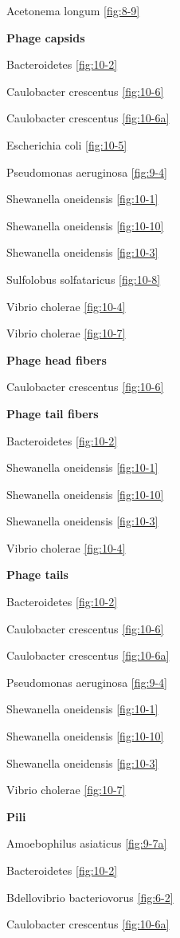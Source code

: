\documentclass[]{tufte-book}
\begin{document}
Acetonema longum \ref{fig:8-9}

\textbf{Phage capsids}

Bacteroidetes \ref{fig:10-2}

Caulobacter crescentus \ref{fig:10-6}

Caulobacter crescentus \ref{fig:10-6a}

Escherichia coli \ref{fig:10-5}

Pseudomonas aeruginosa \ref{fig:9-4}

Shewanella oneidensis \ref{fig:10-1}

Shewanella oneidensis \ref{fig:10-10}

Shewanella oneidensis \ref{fig:10-3}

Sulfolobus solfataricus \ref{fig:10-8}

Vibrio cholerae \ref{fig:10-4}

Vibrio cholerae \ref{fig:10-7}

\textbf{Phage head fibers}

Caulobacter crescentus \ref{fig:10-6}

\textbf{Phage tail fibers}

Bacteroidetes \ref{fig:10-2}

Shewanella oneidensis \ref{fig:10-1}

Shewanella oneidensis \ref{fig:10-10}

Shewanella oneidensis \ref{fig:10-3}

Vibrio cholerae \ref{fig:10-4}

\textbf{Phage tails}

Bacteroidetes \ref{fig:10-2}

Caulobacter crescentus \ref{fig:10-6}

Caulobacter crescentus \ref{fig:10-6a}

Pseudomonas aeruginosa \ref{fig:9-4}

Shewanella oneidensis \ref{fig:10-1}

Shewanella oneidensis \ref{fig:10-10}

Shewanella oneidensis \ref{fig:10-3}

Vibrio cholerae \ref{fig:10-7}

\textbf{Pili}

Amoebophilus asiaticus \ref{fig:9-7a}

Bacteroidetes \ref{fig:10-2}

Bdellovibrio bacteriovorus \ref{fig:6-2}

Caulobacter crescentus \ref{fig:10-6a}
\end{document}
